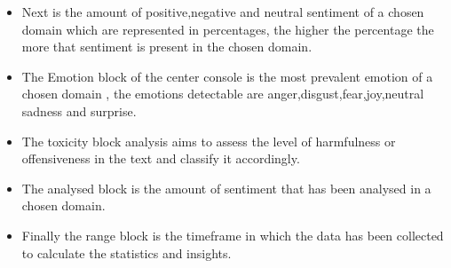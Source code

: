\documentclass[12pt]{article}
\begin{document}
\begin{itemize}
\begin{itemize}
\begin{itemize}
            \item Next is the amount of positive,negative and neutral sentiment of a chosen domain which are represented in percentages, the higher the percentage the more that sentiment is present in the chosen domain.
            \item The Emotion block of the center console is the most prevalent emotion of a chosen domain , the emotions detectable are anger,disgust,fear,joy,neutral sadness and surprise.
            \item The toxicity block analysis aims to assess the level of harmfulness or offensiveness in the text and classify it accordingly.
            \item The analysed block is the amount of sentiment that has been analysed in a chosen domain.
            \item Finally the range block is the timeframe in which the data has been collected to calculate the statistics and insights.
        \end{itemize}
    \end{itemize}
\end{itemize}
\end{document}
